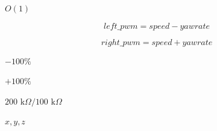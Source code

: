 \documentclass{article}
\begin{document}
$ O(1) $
\pagebreak

\[  left\_pwm = speed - yawrate
\]
\pagebreak

\[  right\_pwm = speed + yawrate
\]
\pagebreak

$ -100\% $
\pagebreak

$ +100\% $
\pagebreak

$ 200\text{ k}\Omega / 100\text{ k}\Omega $
\pagebreak

$ x, y, z $
\pagebreak
\end{document}
